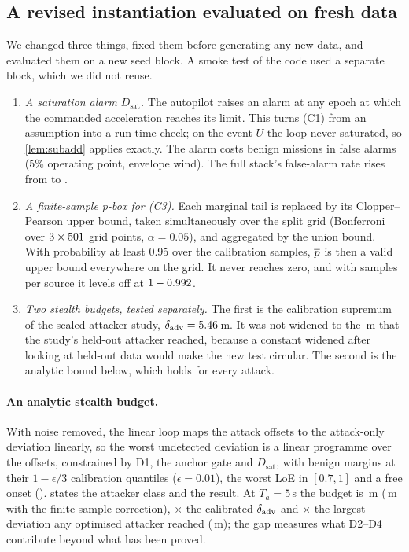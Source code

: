 \subsection{A revised instantiation evaluated on fresh data}
\label{sec:revised}
We changed three things, fixed them before generating any new data, and
evaluated them on a new seed block. A smoke test of the code used a separate
block, which we did not reuse.
\begin{enumerate}
\item \emph{A saturation alarm $D_{\mathrm{sat}}$.} The autopilot raises an alarm
  at any epoch at which the commanded acceleration reaches its limit. This
  turns (C1) from an assumption into a run-time check; on the event $U$ the
  loop never saturated, so \cref{lem:subadd} applies exactly. The alarm costs
  benign missions \nRevSatAlone{} in false alarms (5\% operating point, envelope
  wind). The full stack's false-alarm rate rises from \nRevFprStack{} to
  \nRevFprSat.
\item \emph{A finite-sample p-box for (C3).} Each marginal tail is replaced by
  its Clopper--Pearson upper bound, taken simultaneously over the split grid
  (Bonferroni over $3\times501$ grid points, $\alpha=0.05$), and
  aggregated by the union bound. With probability at least 0.95 over the
  calibration samples, $\overline{p}$ is then a valid upper bound everywhere on the
  grid. It never reaches zero, and with \nCalMissions{} samples per source it
  levels off at $1-0.992$.
\item \emph{Two stealth budgets, tested separately.} The first is the
  calibration supremum of the scaled attacker study, $\delta_{\mathrm{adv}}=5.46$\,m.
  It was not widened to the \nROneAdvMax\,m that the study's held-out
  attacker reached, because a constant
  widened after looking at held-out data would make the new test circular. The
  second is the analytic bound below, which holds for every attack.
\end{enumerate}

\paragraph{An analytic stealth budget.}
With noise removed, the linear loop maps the attack offsets to the attack-only
deviation linearly, so the worst undetected deviation is a linear programme over
the offsets, constrained by D1, the anchor gate and $D_{\mathrm{sat}}$, with
benign margins at their $1-\epsilon/3$ calibration quantiles ($\epsilon=0.01$),
the worst LoE in $[0.7,1]$ and a free onset ().
 states the attacker class and the result. At $T_a=5$\,s
the budget is \nREightSatFive\,m (\nBoundTaFive\,m with the finite-sample correction), \nREightSatRatio$\times$ the calibrated $\delta_{\mathrm{adv}}$
and \nREightSatRatioAdv$\times$ the largest deviation any optimised attacker
reached (\nROneAdvMax\,m); the gap measures what D2--D4 contribute beyond
what has been proved.

